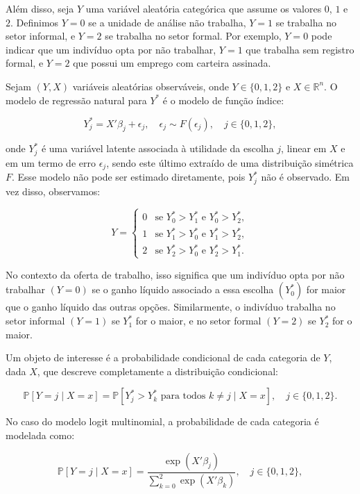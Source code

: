 \documentclass[12pt]{article}
\theoremstyle{break}
\begin{document}
Além disso, seja \( Y \) uma variável aleatória categórica que assume os valores \( 0 \), \( 1 \) e \( 2 \). Definimos \( Y = 0 \) se a unidade de análise não trabalha, \( Y = 1 \) se trabalha no setor informal, e \( Y = 2 \) se trabalha no setor formal. Por exemplo, \( Y = 0 \) pode indicar que um indivíduo opta por não trabalhar, \( Y = 1 \) que trabalha sem registro formal, e \( Y = 2 \) que possui um emprego com carteira assinada.

Sejam \( (Y, X) \) variáveis aleatórias observáveis, onde \( Y \in \{0, 1, 2\} \) e \( X \in \mathbb{R}^n \). O modelo de regressão natural para \( Y^* \) é o modelo de função índice:

\[
Y^*_j = X'\beta_j + \epsilon_j, \quad \epsilon_j \sim F(\epsilon_j), \quad j \in \{0, 1, 2\},
\]

onde \( Y^*_j \) é uma variável latente associada à utilidade da escolha \( j \), linear em \( X \) e em um termo de erro \( \epsilon_j \), sendo este último extraído de uma distribuição simétrica \( F \). Esse modelo não pode ser estimado diretamente, pois \( Y^*_j \) não é observado. Em vez disso, observamos:

\[
Y = 
\begin{cases}
0 & \text{se } Y^*_0 > Y^*_1 \text{ e } Y^*_0 > Y^*_2, \\
1 & \text{se } Y^*_1 > Y^*_0 \text{ e } Y^*_1 > Y^*_2, \\
2 & \text{se } Y^*_2 > Y^*_0 \text{ e } Y^*_2 > Y^*_1.
\end{cases}
\]

No contexto da oferta de trabalho, isso significa que um indivíduo opta por não trabalhar \( (Y = 0) \) se o ganho líquido associado a essa escolha \( (Y^*_0) \) for maior que o ganho líquido das outras opções. Similarmente, o indivíduo trabalha no setor informal \( (Y = 1) \) se \( Y^*_1 \) for o maior, e no setor formal \( (Y = 2) \) se \( Y^*_2 \) for o maior.

Um objeto de interesse é a probabilidade condicional de cada categoria de \( Y \), dada \( X \), que descreve completamente a distribuição condicional:

\[
\mathbb{P}[Y = j \mid X = x] = \mathbb{P}[Y^*_j > Y^*_{k} \text{ para todos } k \neq j \mid X = x], \quad j \in \{0, 1, 2\}.
\]

No caso do modelo logit multinomial, a probabilidade de cada categoria é modelada como:

\[
\mathbb{P}[Y = j \mid X = x] = \frac{\exp(X'\beta_j)}{\sum_{k=0}^{2} \exp(X'\beta_k)}, \quad j \in \{0, 1, 2\},
\]
\end{document}
